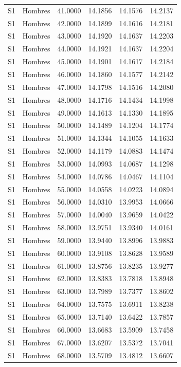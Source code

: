 \begin{longtable}{llrrrr}
S1 & Hombres & 41.0000 & 14.1856 & 14.1576 & 14.2137 \\
S1 & Hombres & 42.0000 & 14.1899 & 14.1616 & 14.2181 \\
S1 & Hombres & 43.0000 & 14.1920 & 14.1637 & 14.2203 \\
S1 & Hombres & 44.0000 & 14.1921 & 14.1637 & 14.2204 \\
S1 & Hombres & 45.0000 & 14.1901 & 14.1617 & 14.2184 \\
S1 & Hombres & 46.0000 & 14.1860 & 14.1577 & 14.2142 \\
S1 & Hombres & 47.0000 & 14.1798 & 14.1516 & 14.2080 \\
S1 & Hombres & 48.0000 & 14.1716 & 14.1434 & 14.1998 \\
S1 & Hombres & 49.0000 & 14.1613 & 14.1330 & 14.1895 \\
S1 & Hombres & 50.0000 & 14.1489 & 14.1204 & 14.1774 \\
S1 & Hombres & 51.0000 & 14.1344 & 14.1055 & 14.1633 \\
S1 & Hombres & 52.0000 & 14.1179 & 14.0883 & 14.1474 \\
S1 & Hombres & 53.0000 & 14.0993 & 14.0687 & 14.1298 \\
S1 & Hombres & 54.0000 & 14.0786 & 14.0467 & 14.1104 \\
S1 & Hombres & 55.0000 & 14.0558 & 14.0223 & 14.0894 \\
S1 & Hombres & 56.0000 & 14.0310 & 13.9953 & 14.0666 \\
S1 & Hombres & 57.0000 & 14.0040 & 13.9659 & 14.0422 \\
S1 & Hombres & 58.0000 & 13.9751 & 13.9340 & 14.0161 \\
S1 & Hombres & 59.0000 & 13.9440 & 13.8996 & 13.9883 \\
S1 & Hombres & 60.0000 & 13.9108 & 13.8628 & 13.9589 \\
S1 & Hombres & 61.0000 & 13.8756 & 13.8235 & 13.9277 \\
S1 & Hombres & 62.0000 & 13.8383 & 13.7818 & 13.8948 \\
S1 & Hombres & 63.0000 & 13.7989 & 13.7377 & 13.8602 \\
S1 & Hombres & 64.0000 & 13.7575 & 13.6911 & 13.8238 \\
S1 & Hombres & 65.0000 & 13.7140 & 13.6422 & 13.7857 \\
S1 & Hombres & 66.0000 & 13.6683 & 13.5909 & 13.7458 \\
S1 & Hombres & 67.0000 & 13.6207 & 13.5372 & 13.7041 \\
S1 & Hombres & 68.0000 & 13.5709 & 13.4812 & 13.6607 \\

\end{longtable}
